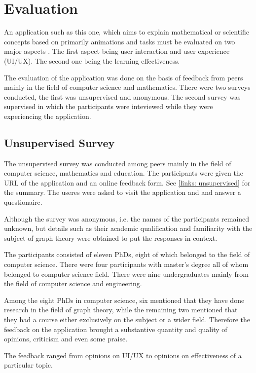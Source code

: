 
\section{Evaluation}

An application such as this one, which aims to explain mathematical or
scientific concepts based on primarily animations and tasks must be evaluated
on two major aspects . The first aspect being user interaction and user
experience (UI/UX). The second one being the learning effectiveness.


The evaluation of the application was done on the basis of feedback from peers
mainly in the field of computer science and mathematics. There were two surveys
conducted, the first was unsupervised and anonymous. The second survey was
supervised in which the participants were inteviewed while they were
experiencing the application.

\subsection{Unsupervised Survey}
The unsupervised survey was conducted among peers mainly in the field of
computer science, mathematics and education. The participants were given the
URL of the application and an online feedback form. See \autoref{links:
unsupervised} for the summary. The useres were asked to visit the application
and and answer a questionaire.

Although the survey was anonymous, i.e. the names of the participants remained
unknown, but details such as their academic qualification and familiarity with
the subject of graph theory were obtained to put the responses in context.

The participants consisted of eleven PhDs, eight of which belonged to the field
of computer science. There were four participants with master's degree all of
whom belonged to computer science field. There were nine undergraduates mainly
from the field of computer science and engineering.

Among the eight PhDs in computer science, six mentioned that they have done
research in the field of graph theory, while the remaining two mentioned that
they had a course either exclusively on the subject or a wider field.
Therefore the feedback on the application brought a substantive quantity and
quality of opinions, criticism and even some praise.

The feedback ranged from opinions on UI/UX to 
opinions on effectiveness of a particular topic.


